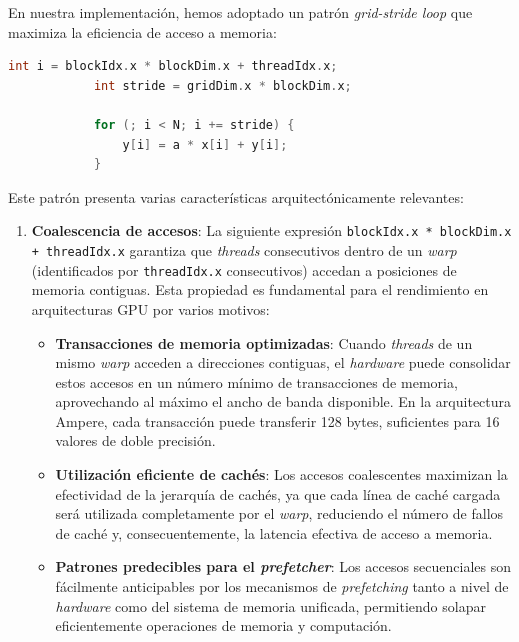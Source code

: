         En nuestra implementación, hemos adoptado un patrón \textit{grid-stride loop} que maximiza la eficiencia de acceso a memoria:
        
        \begin{lstlisting}[language=C, caption={Código \textit{kernel} daxpy.}, gobble=8]
            int i = blockIdx.x * blockDim.x + threadIdx.x;
            int stride = gridDim.x * blockDim.x;
            
            for (; i < N; i += stride) {
                y[i] = a * x[i] + y[i];
            }
        \end{lstlisting}

        Este patrón presenta varias características arquitectónicamente relevantes:
    
        \begin{enumerate}
        
            \item \textbf{Coalescencia de accesos}: La siguiente expresión \texttt{blockIdx.x * blockDim.x + threadIdx.x} garantiza que \textit{threads} consecutivos dentro de un \textit{warp} (identificados por \texttt{threadIdx.x} consecutivos) accedan a posiciones de memoria contiguas. Esta propiedad es fundamental para el rendimiento en arquitecturas GPU por varios motivos:
                
                \begin{itemize}
                
                    \item \textbf{Transacciones de memoria optimizadas}: Cuando \textit{threads} de un mismo \textit{warp} acceden a direcciones contiguas, el \textit{hardware} puede consolidar estos accesos en un número mínimo de transacciones de memoria, aprovechando al máximo el ancho de banda disponible. En la arquitectura Ampere, cada transacción puede transferir 128 bytes, suficientes para 16 valores de doble precisión.
                    
                    \item \textbf{Utilización eficiente de cachés}: Los accesos coalescentes maximizan la efectividad de la jerarquía de cachés, ya que cada línea de caché cargada será utilizada completamente por el \textit{warp}, reduciendo el número de fallos de caché y, consecuentemente, la latencia efectiva de acceso a memoria.
                    
                    \item \textbf{Patrones predecibles para el \textit{prefetcher}}: Los accesos secuenciales son fácilmente anticipables por los mecanismos de \textit{prefetching} tanto a nivel de \textit{hardware} como del sistema de memoria unificada, permitiendo solapar eficientemente operaciones de memoria y computación.
               

\end{itemize}
\end{enumerate}
